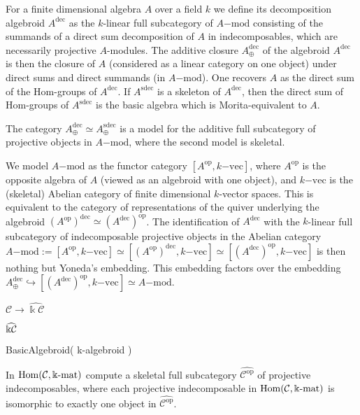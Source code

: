 For a finite dimensional algebra $A$ over a field $k$ we define its decomposition algebroid $A^\mathrm{dec}$ as the $k$-linear full subcategory of $A\mathrm{-mod}$ consisting of the summands of a direct sum decomposition of $A$ in indecomposables, which are necessarily projective $A$-modules. The additive closure $A^\mathrm{dec}_\oplus$ of the algebroid $A^\mathrm{dec}$ is then the closure of $A$ (considered as a linear category on one object) under direct sums and direct summands (in $A\mathrm{-mod}$). One recovers $A$ as the direct sum of the $\mathrm{Hom}$-groups of $A^\mathrm{dec}$. If $A^\mathrm{sdec}$ is a skeleton of $A^\mathrm{dec}$, then the direct sum of $\mathrm{Hom}$-groups of $A^\mathrm{sdec}$ is the basic algebra which is Morita-equivalent to $A$.

The category $A^\mathrm{dec}_\oplus \simeq A^\mathrm{sdec}_\oplus$ is a model for the additive full subcategory of projective objects in $A\mathrm{-mod}$, where the second model is skeletal.

We model $A\mathrm{-mod}$ as the functor category $[A^\mathrm{op}, k\mathrm{-vec}]$, where $A^\mathrm{op}$ is the opposite algebra of $A$ (viewed as an algebroid with one object), and $k\mathrm{-vec}$ is the (skeletal) Abelian category of finite dimensional $k$-vector spaces. This is equivalent to the category of representations of the quiver underlying the algebroid $(A^\mathrm{op})^\mathrm{dec} \simeq (A^\mathrm{dec})^\mathrm{op}$. The identification of $A^\mathrm{dec}$ with the $k$-linear full subcategory of indecomposable projective objects in the Abelian category $A\mathrm{-mod} := [A^\mathrm{op}, k\mathrm{-vec}] \simeq [(A^\mathrm{op})^\mathrm{dec}, k\mathrm{-vec}] \simeq [(A^\mathrm{dec})^\mathrm{op}, k\mathrm{-vec}]$ is then nothing but Yoneda's embedding. This embedding factors over the embedding $A^\mathrm{dec}_\oplus \hookrightarrow [(A^\mathrm{dec})^\mathrm{op}, k\mathrm{-vec}] \simeq A\mathrm{-mod}$.

$\mathcal{C} \rightarrow \widehat{\Bbbk\mathcal{C}}$

$\widehat{\Bbbk\mathcal{C}}$

BasicAlgebroid( k-algebroid )

In $\mathrm{Hom}(\mathcal{C},\Bbbk\textnormal{-}\mathrm{mat})$ compute a skeletal full subcategory
$\widehat{\mathcal{C}^{\mathrm{op}}}$ of projective indecomposables,
where each projective indecomposable in $\mathrm{Hom}(\mathcal{C},\Bbbk\textnormal{-}\mathrm{mat})$ is isomorphic to exactly one
object in $\widehat{\mathcal{C}^{\mathrm{op}}}$.

